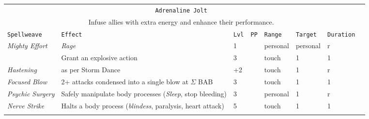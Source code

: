 \documentclass[10pt,a4paper]{article}
\begin{document}
\begin{table}[htbp!]
\begin{tabular}{llllllll}
    
  \multicolumn{7}{c}{\texttt{Adrenaline Jolt}}\\
  \multicolumn{7}{c}{Infuse allies with extra energy and enhance their performance.}\\
    \hline
    \texttt{Spellweave} & \texttt{Effect} & \texttt{Lvl} & \texttt{PP} & \texttt{Range} & \texttt{Target} & \texttt{Duration} \\
    \hline
    \multirow{1}{*}{\textit{Mighty Effort}} & \textit{Rage} & 1 && personal & personal & r\\
    									    & Grant an explosive action & 3 && touch & 1 & 1\\
    \hline
    \multirow{1}{*}{\textit{Hastening}} & as per Storm Dance & +2 && touch & 1 & r\\
    \hline
    \multirow{1}{*}{\textit{Focused Blow}} & 2+ attacks condensed into a single blow at $\Sigma$ BAB & 3 && touch & 1 & 1\\
    \hline
    \multirow{1}{*}{\textit{Psychic Surgery}} & Safely manipulate body processes (\textit{Sleep}, stop bleeding) & 3 && personal & 1 & r \\
    \hline
    \multirow{1}{*}{\textit{Nerve Strike}} & Halts a body process (\textit{blindess}, paralysis, heart attack) & 5 && touch & 1 & 1 \\
    &&&&&&\\
    
    
    

\end{tabular}
\end{table}
\end{document}
